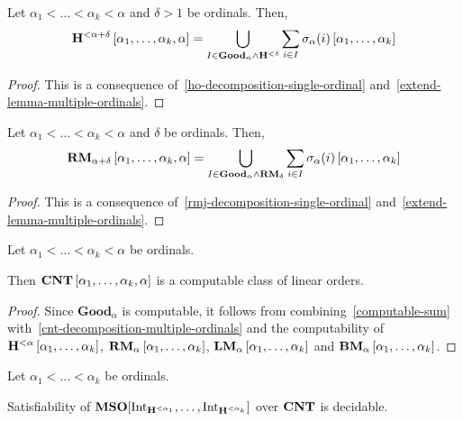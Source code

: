 \begin{lemma}\label{ho-decomposition-multiple-ordinals}
  Let $\alpha_1 < \ldots < \alpha_k < \alpha$ and $\delta > 1$ be ordinals. Then,
  \[
    \mathbf{H}_{}^{< \alpha + \delta} \left[ {\alpha_1, \ldots, \alpha_k, \alpha} \right]
    = \bigcup_{I \in \mathbf{Good}_{\alpha} \wedge \mathbf{H}_{}^{< \delta}}
    \sum_{i \in I} \sigma_{\alpha}(i) \left[ {\alpha_1, \ldots, \alpha_k} \right]
  \]
\end{lemma}

\begin{proof}
  This is a consequence of~\cref{ho-decomposition-single-ordinal}
  and~\cref{extend-lemma-multiple-ordinals}.
\end{proof}

\begin{lemma}\label{rmj-decomposition-multiple-ordinals}
  Let $\alpha_1 < \ldots < \alpha_k < \alpha$ and $\delta$ be ordinals.
  Then,
  \[
    \mathbf{RM}_{\alpha + \delta} \left[ {\alpha_1, \ldots, \alpha_k, \alpha} \right]
    = \bigcup_{I \in \mathbf{Good}_{\alpha} \wedge \mathbf{RM}_{\delta}}
    \sum_{i \in I} \sigma_{\alpha}(i) \left[ {\alpha_1, \ldots, \alpha_k} \right]
  \]
\end{lemma}

\begin{proof}
  This is a consequence of~\cref{rmj-decomposition-single-ordinal}
  and~\cref{extend-lemma-multiple-ordinals}.
\end{proof}

\begin{lemma}\label{cnt-decidable-multiple-ordinals}
  Let $\alpha_1 < \ldots < \alpha_k < \alpha$ be ordinals.

  Then $\mathbf{CNT} \left[ {\alpha_1, \ldots, \alpha_k, \alpha} \right]$
  is a computable class of linear orders.
\end{lemma}

\begin{proof}
  Since $\mathbf{Good}_{\alpha}$ is computable,
  it follows from combining~\cref{computable-sum}
  with~\cref{cnt-decomposition-multiple-ordinals} and the computability
  of $\mathbf{H}_{}^{< \alpha} \left[ {\alpha_1, \ldots, \alpha_k} \right]$,
  $\mathbf{RM}_{\alpha} \left[ {\alpha_1, \ldots, \alpha_k} \right]$,
  $\mathbf{LM}_{\alpha} \left[ {\alpha_1, \ldots, \alpha_k} \right]$ and
  $\mathbf{BM}_{\alpha} \left[ {\alpha_1, \ldots, \alpha_k} \right]$.
\end{proof}

\begin{theorem}\label{multiple-ordinals-satisfiability}
  Let $\alpha_1 < \ldots < \alpha_k$ be ordinals.

  Satisfiability of $\mathbf{MSO}[\mathrm{Int}_{\mathbf{H}_{}^{< \alpha_1}}, \ldots, \mathrm{Int}_{\mathbf{H}_{}^{< \alpha_k}}]$
  over $\mathbf{CNT}$ is decidable.
\end{theorem}

